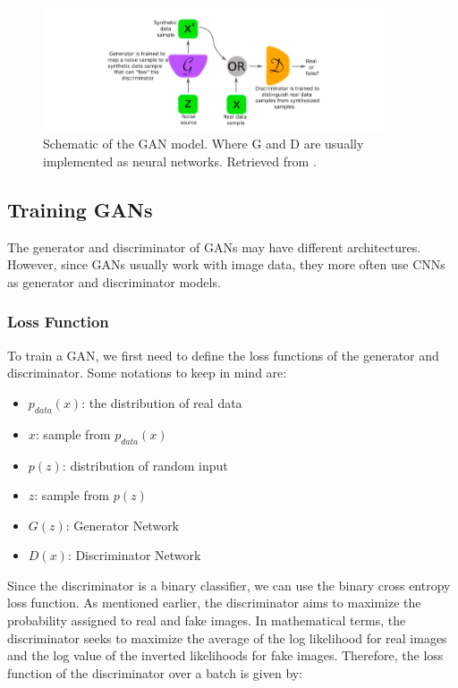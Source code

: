 \begin{figure}[!htb]
  \centering
  \includegraphics[width=0.90\textwidth]{Images/GAN.jpg}
  \caption[Schematic of the \ac{GAN} model. Where G and D are usually implemented as neural networks.]{Schematic of the \ac{GAN} model. Where G and D are usually implemented as neural networks. Retrieved from \cite{GAN}.}
  \label{GAN}
\end{figure}

\subsection{Training GANs}

The generator and discriminator of \ac{GANs} may have different architectures. However, since \ac{GANs} usually work with image data, they more often use \ac{CNNs} as generator and discriminator models.

\subsubsection*{Loss Function}

To train a \ac{GAN}, we first need to define the loss functions of the generator and discriminator. Some notations to keep in mind are:

\begin{itemize}
    \item $p_{data}(x)$: the distribution of real data
    \item $x$: sample from $p_{data}(x)$
    \item $p(z)$: distribution of random input
    \item $z$: sample from $p(z)$
    \item $G(z)$: Generator Network
    \item $D(x)$: Discriminator Network
\end{itemize}

Since the discriminator is a binary classifier, we can use the binary cross entropy loss function. As mentioned earlier, the discriminator aims to maximize the probability assigned to real and fake images. In mathematical terms, the discriminator seeks to maximize the average of the log likelihood for real images and the log value of the inverted likelihoods for fake images. Therefore, the loss function of the discriminator over a batch is given by:

